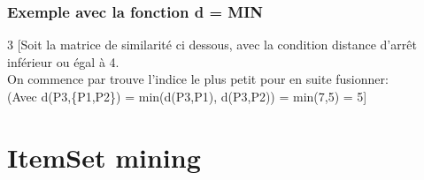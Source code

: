 \subsection{Exemple avec la fonction d = MIN}
\begin{multicols}{3}
[Soit la matrice de similarité ci dessous, avec la condition distance d'arrêt inférieur ou égal à 4.\\
On commence par trouve l'indice le plus petit pour en suite fusionner:\\
(Avec d(P3,\{P1,P2\}) = min(d(P3,P1), d(P3,P2)) = min(7,5) = 5]
  
\end{multicols}
\pagebreak
\chapter{ItemSet mining}
\pagebreak